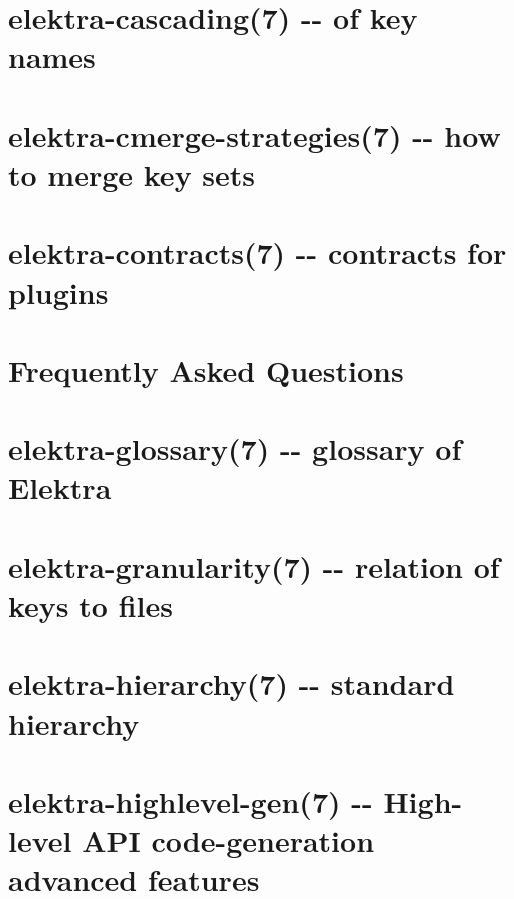 \documentclass[twoside]{book}
\newcommand{\+}{\discretionary{\mbox{\scriptsize$\hookleftarrow$}}{}{}}
\begin{document}
\chapter{elektra-\/cascading(7) -\/-\/ of key names}
\label{doc_help_elektra-cascading_md}

\chapter{elektra-\/cmerge-\/strategies(7) -\/-\/ how to merge key sets}
\label{doc_help_elektra-cmerge-strategy_md}

\chapter{elektra-\/contracts(7) -\/-\/ contracts for plugins}
\label{doc_help_elektra-contracts_md}

\chapter{Frequently Asked Questions}
\label{doc_help_elektra-faq_md}

\chapter{elektra-\/glossary(7) -\/-\/ glossary of Elektra}
\label{doc_help_elektra-glossary_md}

\chapter{elektra-\/granularity(7) -\/-\/ relation of keys to files}
\label{doc_help_elektra-granularity_md}

\chapter{elektra-\/hierarchy(7) -\/-\/ standard hierarchy}
\label{doc_help_elektra-hierarchy_md}

\chapter{elektra-\/highlevel-\/gen(7) -\/-\/ High-\/level A\+PI code-\/generation advanced features}
\label{doc_help_elektra-highlevel-gen_md}

\end{document}
